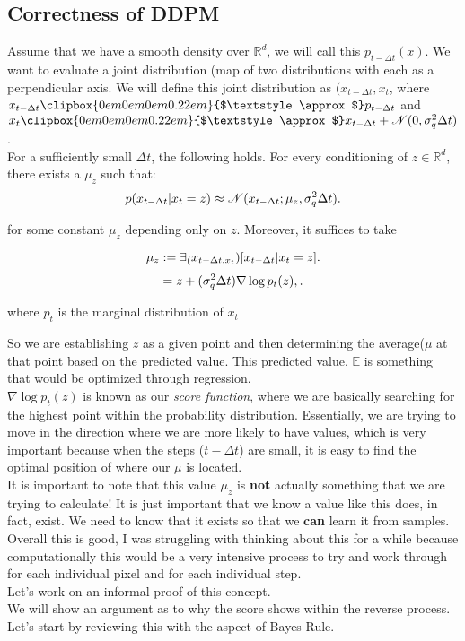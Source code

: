 \documentclass[10pt, oneside]{report}
\newcommand{\halfapprox}{\mathchoice{%
\clipbox{0em 0em 0em 0.22em}{$\displaystyle\approx$}}{%
\clipbox{0em 0em 0em 0.22em}{$\textstyle\approx$}}{%
\clipbox{0em 0em 0em 0.18em}{$\scriptstyle\approx$}}{%
\clipbox{0em 0em 0em 0.18em}{$\scriptscriptstyle\approx$}}}
\newcommand{\R}{\mathbb{R}}
\newcommand{\E}{\mathbb{E}}
\begin{document}
\subsection{Correctness of DDPM}
Assume that we have a smooth density over $\R^d$, we will call this $p_{t-\Delta t}(x)$.  We want to evaluate a joint distribution (map of two distributions with each as a perpendicular axis. We will define this joint distribution as $(x_{t-\Delta t}, x_t$, where $x_{t-\Delta t} \halfapprox p_{t-\Delta t}$ and $x_t \halfapprox x_{t-\Delta t} + \mathcal{N}(0, \sigma^2_q \Delta t)$.\\
For a sufficiently small $\Delta t$, the following holds. For every conditioning of $z \in \R^d$, there exists a $\mu_z$ such that:
\[
	p(x_{t-\Delta t} | x_t = z) \approx \mathcal{N}(x_{t-\Delta t}; \mu_z, \sigma^2_q \Delta t)\\
.\]
\begin{center}
    
	for some constant $\mu_z$ depending only on $z$.  Moreover, it suffices to take \\
\end{center}
\[
	\mu_z := \exists_(x_{t-\Delta t, x_t}) [x_{t-\Delta t} | x_t = z] \\
.\]
\[
	= z + (\sigma^2_q \Delta t) \nabla \log p_t (z), \\
.\]
\begin{center}
	where $p_t$ is the marginal distribution of $x_t$\\
\end{center}

So we are establishing $z$ as a given point and then determining the average($\mu$ at that point based on the predicted value.  This predicted value, $\E$ is something that would be optimized through regression.\\
$\nabla \log p_t (z)$ is known as our \textit{score function}, where we are basically searching for the highest point within the probability distribution.  Essentially, we are trying to move in the direction where we are more likely to have values, which is very important because when the steps ($t-\Delta t$) are small, it is easy to find the optimal position of where our $\mu$ is located.\\
It is important to note that this value $\mu_z$ is \textbf{not} actually something that we are trying to calculate! It is just important that we know a value like this does, in fact, exist.  We need to know that it exists so that we \textbf{can} learn it from samples.\\ 
Overall this is good, I was struggling with thinking about this for a while because computationally this would be a very intensive process to try and work through for each individual pixel and for each individual step. \\
Let's work on an informal proof of this concept. \\
We will show an argument as to why the score shows within the reverse process.  Let's start by reviewing this with the aspect of Bayes Rule.  
\end{document}

